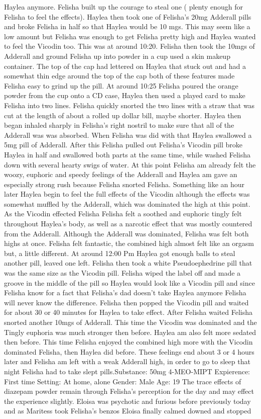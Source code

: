\documentclass[12pt]{book}
\begin{document}
Haylea anymore. Felisha built up the courage to steal one ( plenty enough for Felisha to feel the effects). Haylea then took one of Felisha's 20mg Adderall pills and broke Felisha in half so that Haylea would be 10 mgs. This may seem like a low amount but Felisha was enough to get Felisha pretty high and Haylea wanted to feel the Vicodin too. This was at around 10:20. Felisha then took the 10mgs of Adderall and ground Felisha up into powder in a cup used a skin makeup container. The top of the cap had lettered on Haylea that stuck out and had a somewhat thin edge around the top of the cap both of these features made Felisha easy to grind up the pill. At around 10:25 Felisha poured the orange powder from the cup onto a CD case, Haylea then used a played card to make Felisha into two lines. Felisha quickly snorted the two lines with a straw that was cut at the length of about a rolled up dollar bill, maybe shorter. Haylea then began inhaled sharply in Felisha's right nostril to make sure that all of the Adderall was was absorbed. When Felisha was did with that Haylea swallowed a 5mg pill of Adderall. After this Felisha pulled out Felisha's Vicodin pill broke Haylea in half and swallowed both parts at the same time, while washed Felisha down with several hearty swigs of water. At this point Felisha am already felt the woozy, euphoric and speedy feelings of the Adderall and Haylea am gave an especially strong rush because Felisha snorted Felisha. Something like an hour later Haylea begin to feel the full effects of the Vicodin although the effects was somewhat muffled by the Adderall, which was dominated the high at this point. As the Vicodin effected Felisha Felisha felt a soothed and euphoric tingly felt throughout Haylea's body, as well as a narcotic effect that was mostly countered from the Adderall. Although the Adderall was dominated, Felisha was felt both highs at once. Felisha felt fantastic, the combined high almost felt like an orgasm but, a little different. At around 12:00 Pm Haylea got enough balls to steal another pill, leaved one left. Felisha then took a white Pseudoephedrine pill that was the same size as the Vicodin pill. Felisha wiped the label off and made a groove in the middle of the pill so Haylea would look like a Vicodin pill and since Felisha know for a fact that Felisha's dad doesn't take Haylea anymore Felisha will never know the difference. Felisha then popped the Vicodin pill and waited for about 30 or 40 minutes for Haylea to take effect. After Felisha waited Felisha snorted another 10mgs of Adderall. This time the Vicodin was dominated and the Tingly euphoria was much stronger then before. Haylea am also felt more sedated then before. This time Felisha enjoyed the combined high more with the Vicodin dominated Felisha, then Haylea did before. These feelings end about 3 or 4 hours later and Felisha am left with a weak Adderall high, in order to go to sleep that night Felisha had to take slept pills.Substance: 50mg 4-MEO-MIPT Expierence: First time Setting: At home, alone Gender: Male Age: 19 The trace effects of diazepam powder remain through Felisha's perception for the day and may effect the experience slightly. Eloisa was psychotic and furious before previously today and as Maritess took Felisha's benzos Eloisa finally calmed downed and stopped 
\end{document}
